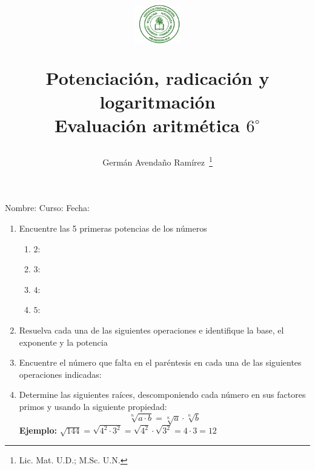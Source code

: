 \documentclass[twosides]{article}
\author{Germ\'an Avenda\~no Ram\'irez~\thanks{Lic. Mat. U.D.; M.Sc. U.N.}}
\title{\begin{minipage}{0.15\textwidth}\includegraphics[height=1.7cm]{Images/logo-colegio.png}
\end{minipage}\hfill \begin{minipage}{0.85\textwidth}\begin{center}
Potenciación, radicación y logaritmación\\Evaluación aritmética $6^{\circ}$\end{center}
\end{minipage}}
\date{}
\begin{document}
\maketitle
Nombre: \hrulefill Curso: \underline{\hspace{1cm}}  Fecha: \underline{\hspace{2cm}}\\
\begin{enumerate}
  \item Encuentre las 5 primeras potencias de los números
  \begin{enumerate}
    \item $ 2 $: \hrulefill
    \item $ 3 $: \hrulefill
    \item $ 4 $: \hrulefill
    \item $ 5 $: \hrulefill
  \end{enumerate}
  \item Resuelva cada una de las siguientes operaciones e identifique la base, el exponente y la potencia
  \begin{enumerate}
  \end{enumerate}
  \item Encuentre el número que falta en el paréntesis en cada una de las siguientes operaciones indicadas:
  \begin{enumerate}
  \end{enumerate}
  \item Determine las siguientes raíces, descomponiendo cada número en sus factores primos y usando la siguiente propiedad:
  \[ \sqrt[n]{a\cdot b}=\sqrt[n]{a}\cdot\sqrt[n]{b} \]
  \textbf{Ejemplo:} $ \sqrt{144}=\sqrt{4^2\cdot3^2 }= \sqrt{4^2}\cdot\sqrt{3^2}=4\cdot3=12$\\

\end{enumerate}
\end{document}
